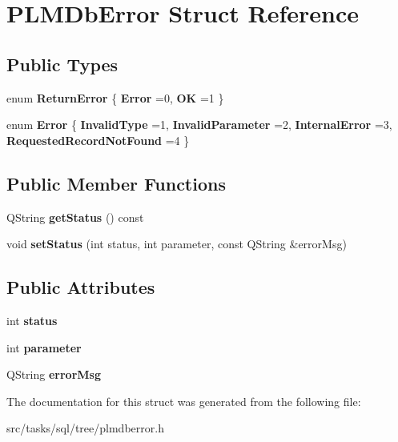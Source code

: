 \hypertarget{struct_p_l_m_db_error}{}\section{P\+L\+M\+Db\+Error Struct Reference}
\label{struct_p_l_m_db_error}
\subsection*{Public Types}
\begin{DoxyCompactItemize}
\item 
enum {\bfseries Return\+Error} \{ {\bfseries Error} =0, 
{\bfseries OK} =1
 \}\hypertarget{struct_p_l_m_db_error_aaf5ee57ca577a094f23cec1c195965cf}{}\label{struct_p_l_m_db_error_aaf5ee57ca577a094f23cec1c195965cf}

\item 
enum {\bfseries Error} \{ {\bfseries Invalid\+Type} =1, 
{\bfseries Invalid\+Parameter} =2, 
{\bfseries Internal\+Error} =3, 
{\bfseries Requested\+Record\+Not\+Found} =4
 \}\hypertarget{struct_p_l_m_db_error_a48e11f0b78e3a889668ecfe25d239402}{}\label{struct_p_l_m_db_error_a48e11f0b78e3a889668ecfe25d239402}

\end{DoxyCompactItemize}
\subsection*{Public Member Functions}
\begin{DoxyCompactItemize}
\item 
Q\+String {\bfseries get\+Status} () const \hypertarget{struct_p_l_m_db_error_af1eea58d11efb9e9d10867e41765997a}{}\label{struct_p_l_m_db_error_af1eea58d11efb9e9d10867e41765997a}

\item 
void {\bfseries set\+Status} (int status, int parameter, const Q\+String \&error\+Msg)\hypertarget{struct_p_l_m_db_error_a985a2a614d70453f86c84ffa0df2379a}{}\label{struct_p_l_m_db_error_a985a2a614d70453f86c84ffa0df2379a}

\end{DoxyCompactItemize}
\subsection*{Public Attributes}
\begin{DoxyCompactItemize}
\item 
int {\bfseries status}\hypertarget{struct_p_l_m_db_error_a2b258798884598e32ce5391ef4895f63}{}\label{struct_p_l_m_db_error_a2b258798884598e32ce5391ef4895f63}

\item 
int {\bfseries parameter}\hypertarget{struct_p_l_m_db_error_a347b0618011dfcdc200b235fd7265297}{}\label{struct_p_l_m_db_error_a347b0618011dfcdc200b235fd7265297}

\item 
Q\+String {\bfseries error\+Msg}\hypertarget{struct_p_l_m_db_error_ace09c3fafe8fa3974537c8182490f314}{}\label{struct_p_l_m_db_error_ace09c3fafe8fa3974537c8182490f314}

\end{DoxyCompactItemize}


The documentation for this struct was generated from the following file\+:\begin{DoxyCompactItemize}
\item 
src/tasks/sql/tree/plmdberror.\+h\end{DoxyCompactItemize}
